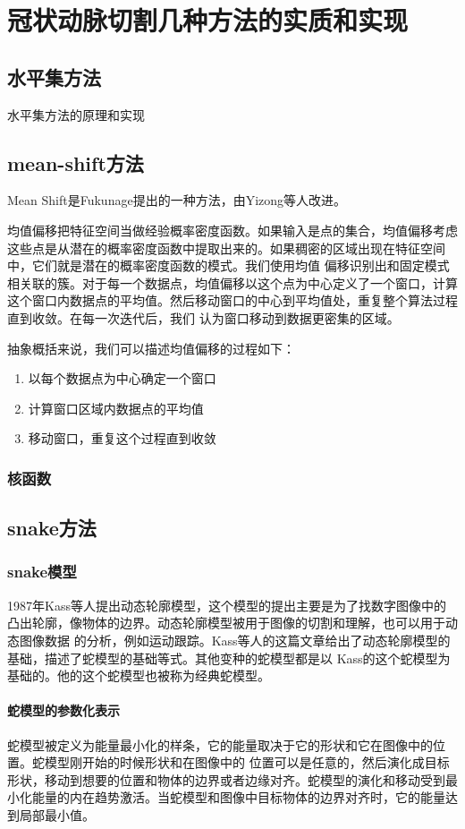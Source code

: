 \chapter{冠状动脉切割几种方法的实质和实现}
\section{水平集方法}
水平集方法的原理和实现
\section{mean-shift方法}
Mean
Shift是Fukunage提出的一种方法\cite{Fukunaga1975The}，由Yizong等人改进\cite{Cheng1995Mean}。

均值偏移把特征空间当做经验概率密度函数。如果输入是点的集合，均值偏移考虑这些点是从潜在的概率密度函数中提取出来的。如果稠密的区域出现在特征空间中，它们就是潜在的概率密度函数的模式。我们使用均值
偏移识别出和固定模式相关联的簇。对于每一个数据点，均值偏移以这个点为中心定义了一个窗口，计算这个窗口内数据点的平均值。然后移动窗口的中心到平均值处，重复整个算法过程直到收敛。在每一次迭代后，我们
认为窗口移动到数据更密集的区域。

抽象概括来说，我们可以描述均值偏移的过程如下：
\begin{enumerate}
  \item 以每个数据点为中心确定一个窗口
  \item 计算窗口区域内数据点的平均值
  \item 移动窗口，重复这个过程直到收敛
\end{enumerate}
\subsection{核函数}


\section{snake方法}
\subsection{snake模型}
1987年Kass等人提出动态轮廓模型\cite{kass1988snakes}，这个模型的提出主要是为了找数字图像中的
凸出轮廓，像物体的边界。动态轮廓模型被用于图像的切割和理解，也可以用于动态图像数据
的分析，例如运动跟踪。Kass等人\cite{kass1988snakes}的这篇文章给出了动态轮廓模型的基础，描述了蛇模型的基础等式。其他变种的蛇模型都是以
Kass的这个蛇模型为基础的。他的这个蛇模型也被称为经典蛇模型。
\subsubsection{蛇模型的参数化表示}
蛇模型被定义为能量最小化的样条，它的能量取决于它的形状和它在图像中的位置。蛇模型刚开始的时候形状和在图像中的
位置可以是任意的，然后演化成目标形状，移动到想要的位置和物体的边界或者边缘对齐。蛇模型的演化和移动受到最小化能量的内在趋势激活。当蛇模型和图像中目标物体的边界对齐时，它的能量达到局部最小值。

